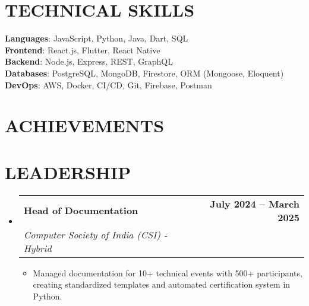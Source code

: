 \documentclass[letterpaper,11pt]{article}
\makeatletter
\newcommand{\resumeItem}[1]{
  \item\small{
    {#1 \vspace{-2pt}}
  }
}
\newcommand{\resumeSubheading}[4]{
  \vspace{-2pt}\item
    \begin{tabular*}{1.0\textwidth}[t]{l@{\extracolsep{\fill}}r}
      \textbf{#1} & \textbf{\small #2} \\
      \textit{\small#3} & \textit{\small #4} \\
    \end{tabular*}\vspace{-7pt}
}
\newcommand{\resumeSubHeadingListStart}{\begin{itemize}[leftmargin=0.0in, label={}]}
\newcommand{\resumeSubHeadingListEnd}{\end{itemize}}
\newcommand{\resumeItemListStart}{\begin{itemize}}
\newcommand{\resumeItemListEnd}{\end{itemize}\vspace{-5pt}}
\makeatother
\begin{document}
\section{TECHNICAL SKILLS}
 \begin{itemize}[leftmargin=0.15in, label={}]
    \small{\item{
     \textbf{Languages}{: JavaScript, Python, Java, Dart, SQL} \\
     \textbf{Frontend}{: React.js, Flutter, React Native} \\
     \textbf{Backend}{: Node.js, Express, REST, GraphQL} \\
     \textbf{Databases}{: PostgreSQL, MongoDB, Firestore, ORM (Mongoose, Eloquent)} \\
     \textbf{DevOps}{: AWS, Docker, CI/CD, Git, Firebase, Postman} \\
    }}
 \end{itemize}
 \vspace{-16pt}

\section{ACHIEVEMENTS}
  \vspace{-16pt}

\section{LEADERSHIP}
    \resumeSubHeadingListStart
        \resumeSubheading
          {Head of Documentation}{July 2024 -- March 2025}
          {Computer Society of India (CSI) - Hybrid}{}
          \resumeItemListStart
            \resumeItem{Managed documentation for 10+ technical events with 500+ participants, creating standardized templates and automated certification system in Python.}
          \resumeItemListEnd
    \resumeSubHeadingListEnd
\end{document}
